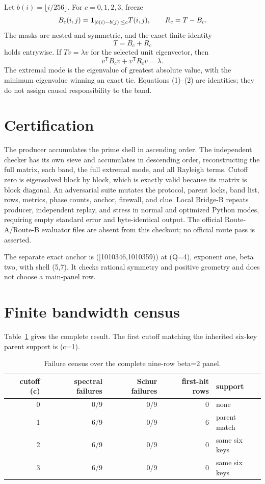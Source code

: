 \documentclass[10pt]{article}
\begin{document}
Let \(b(i)=\lfloor i/256\rfloor\).  For \(c=0,1,2,3\), freeze
\[
B_c(i,j)={\bf1}_{|b(i)-b(j)|\leq c}T(i,j),\qquad R_c=T-B_c.
\]
The masks are nested and symmetric, and the exact finite identity
\[
                         T=B_c+R_c                         \tag{1}
\]
holds entrywise.  If \(Tv=\lambda v\) for the selected unit eigenvector,
then
\[
 v^{\mathsf T}B_cv+v^{\mathsf T}R_cv=\lambda.                 \tag{2}
\]
The extremal mode is the eigenvalue of greatest absolute value, with the
minimum eigenvalue winning an exact tie.  Equations (1)--(2) are identities;
they do not assign causal responsibility to the band.

\section{Certification}

The producer accumulates the prime shell in ascending order.  The independent
checker has its own sieve and accumulates in descending order, reconstructing
the full matrix, each band, the full extremal mode, and all Rayleigh terms.
Cutoff zero is eigensolved block by block, which is exactly valid because its
matrix is block diagonal.  An adversarial suite mutates the protocol, parent
locks, band list, rows, metrics, phase counts, anchor, firewall, and clue.
Local Bridge-B repeats producer, independent replay, and stress in normal and
optimized Python modes, requiring empty standard error and byte-identical
output.  The official Route-A/Route-B evaluator files are absent from this
checkout; no official route pass is asserted.

The separate exact anchor is ([1010346,1010359)) at (Q=4), exponent one,
beta two, with shell ({5,7}).  It checks rational symmetry and positive
geometry and does not choose a main-panel row.

\section{Finite bandwidth census}

Table~\ref{tab:census} gives the complete result.  The first cutoff matching
the inherited six-key parent support is (c=1).

\begin{table}[h]
\centering
\caption{Failure census over the complete nine-row beta=2 panel.}
\label{tab:census}
\begin{tabular}{@{}rrrrl@{}}
\toprule
cutoff (c) & spectral failures & Schur failures & first-hit rows & support\\
\midrule
0 & 0/9 & 0/9 & 0 & none\\
1 & 6/9 & 0/9 & 6 & parent match\\
2 & 6/9 & 0/9 & 0 & same six keys\\
3 & 6/9 & 0/9 & 0 & same six keys\\
\bottomrule
\end{tabular}
\end{table}
\end{document}
